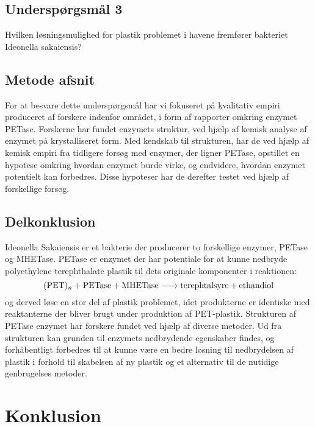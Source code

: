 \documentclass[12pt]{article}
\begin{document}
\subsection*{Underspørgsmål 3}

Hvilken løsningsmulighed for plastik problemet i havene fremfører bakteriet Ideonella sakaiensis?

\subsection*{Metode afsnit}

For at besvare dette underspørgsmål har vi fokuseret på kvalitativ empiri produceret af forskere indenfor området, i form af rapporter omkring enzymet PETase. Forskerne har fundet enzymets struktur, ved hjælp af kemisk analyse af enzymet på krystalliseret form. Med kendskab til strukturen, har de ved hjælp af kemisk empiri fra tidligere forsøg med enzymer, der ligner PETase, opstillet en hypotese omkring hvordan enzymet burde virke, og endvidere, hvordan enzymet potentielt kan forbedres. Disse hypoteser har de derefter testet ved hjælp af forskellige forsøg.

\subsection*{Delkonklusion}

Ideonella Sakaiensis er et bakterie der producerer to forskellige enzymer, PETase og MHETase. PETase er enzymet der har potentiale for at kunne nedbryde polyethylene terephthalate plastik til dets originale komponenter i reaktionen:
$$\ce{(PET)_n + PETase + MHETase -> terephtalsyre + ethandiol}$$
og derved løse en stor del af plastik problemet, idet produkterne er identiske med reaktanterne der bliver brugt under produktion af PET-plastik. Strukturen af PETase enzymet har forskere fundet ved hjælp af diverse metoder. Ud fra strukturen kan grunden til enzymets nedbrydende egenskaber findes, og forhåbentligt forbedres til at kunne være en bedre løsning til nedbrydelsen af plastik i forhold til skabelsen af ny plastik og et alternativ til de nutidige genbrugelses metoder.

\section*{Konklusion}
\end{document}
